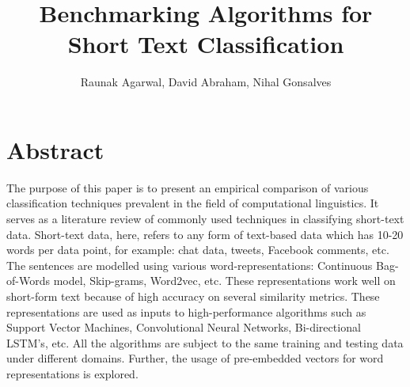 \documentclass[11pt, oneside]{article}   	%
\title{Benchmarking Algorithms for Short Text Classification}
\author{Raunak Agarwal, David Abraham, Nihal Gonsalves}
\date{}							%
\begin{document}

\begin{titlepage}
\null  %
\nointerlineskip  %
\vfill
\let\snewpage \newpage
\let\newpage \relax
\maketitle
\let \newpage \snewpage
\vfill 
\break %
\end{titlepage}


\newpage
\tableofcontents
\newpage




\section{Abstract}
The purpose of this paper is to present an empirical comparison of various classification techniques prevalent in the field of computational linguistics. It serves as a literature review of commonly used techniques in classifying short-text data. Short-text data, here, refers to any form of text-based data which has 10-20 words per data point, for example: chat data, tweets, Facebook comments, etc.
\\
The sentences are modelled using various word-representations: Continuous Bag-of-Words model, Skip-grams, Word2vec, etc. These representations work well on short-form text because of high accuracy on several similarity metrics. These representations are used as inputs to high-performance algorithms such as Support Vector Machines, Convolutional Neural Networks, Bi-directional LSTM's, etc. All the algorithms are subject to the same training and testing data under different domains. Further, the usage of pre-embedded vectors for word representations is explored.


\end{document}
